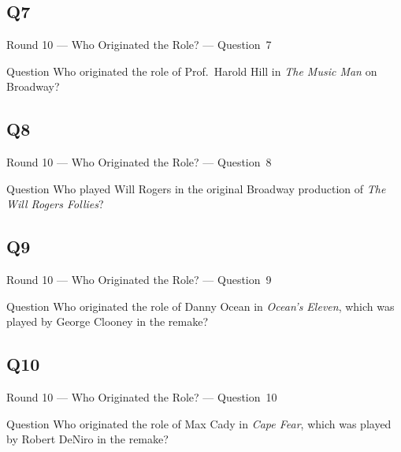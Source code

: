 \documentclass[11pt]{beamer}
\begin{document}
\subsection*{Q7}
\begin{frame}[t]{Round 10 --- Who Originated the Role? --- \mbox{Question 7}}
\vspace{-0.5em}
\begin{block}{Question}
Who originated the role of Prof.\ Harold Hill in \emph{The Music Man} on Broadway?
\end{block}
\end{frame}
\subsection*{Q8}
\begin{frame}[t]{Round 10 --- Who Originated the Role? --- \mbox{Question 8}}
\vspace{-0.5em}
\begin{block}{Question}
Who played Will Rogers in the original Broadway production of \emph{The Will Rogers Follies}?
\end{block}
\end{frame}
\subsection*{Q9}
\begin{frame}[t]{Round 10 --- Who Originated the Role? --- \mbox{Question 9}}
\vspace{-0.5em}
\begin{block}{Question}
Who originated the role of Danny Ocean in \emph{Ocean's Eleven}, which was played by George Clooney in the remake?
\end{block}
\end{frame}
\subsection*{Q10}
\begin{frame}[t]{Round 10 --- Who Originated the Role? --- \mbox{Question 10}}
\vspace{-0.5em}
\begin{block}{Question}
Who originated the role of Max Cady in \emph{Cape Fear}, which was played by Robert DeNiro in the remake?
\end{block}
\end{frame}
\end{document}
